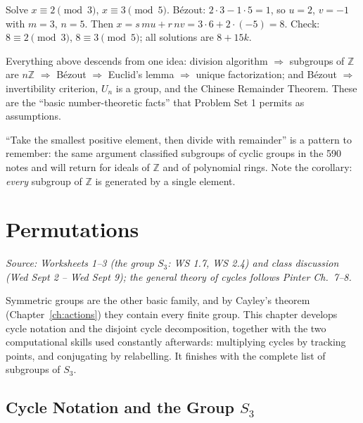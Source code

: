 \documentclass[11pt]{report}
\begin{document}
\begin{exbox}\label{ex:crt-computation}
Solve $x \equiv 2 \pmod 3$, $x \equiv 3 \pmod 5$. B\'ezout: $2 \cdot 3 - 1 \cdot 5 = 1$, so $u = 2$, $v = -1$ with $m = 3$, $n = 5$. Then $x = s\,mu + r\,nv = 3 \cdot 6 + 2 \cdot (-5) = 8$. Check: $8 \equiv 2 \pmod 3$, $8 \equiv 3 \pmod 5$; all solutions are $8 + 15k$.
\end{exbox}

\begin{rembox}\label{rem:dependency-chain-z}
Everything above descends from one idea: division algorithm $\Rightarrow$ subgroups of $\mathbb{Z}$ are $n\mathbb{Z}$ $\Rightarrow$ B\'ezout $\Rightarrow$ Euclid's lemma $\Rightarrow$ unique factorization; and B\'ezout $\Rightarrow$ invertibility criterion, $U_n$ is a group, and the Chinese Remainder Theorem. These are the ``basic number-theoretic facts'' that Problem Set 1 permits as assumptions.
\end{rembox}

\begin{rembox}\label{rem:division-algorithm-pattern}
``Take the smallest positive element, then divide with remainder'' is a pattern to remember: the same argument classified subgroups of cyclic groups in the 590 notes and will return for ideals of $\mathbb{Z}$ and of polynomial rings. Note the corollary: \emph{every} subgroup of $\mathbb{Z}$ is generated by a single element.
\end{rembox}

\chapter{Permutations}\label{ch:perms}

\textit{Source: Worksheets 1--3 (the group $S_3$: WS 1.7, WS 2.4) and class discussion (Wed Sept 2 -- Wed Sept 9); the general theory of cycles follows Pinter Ch.\ 7--8.}

Symmetric groups are the other basic family, and by Cayley's theorem (Chapter~\ref{ch:actions}) they contain every finite group. This chapter develops cycle notation and the disjoint cycle decomposition, together with the two computational skills used constantly afterwards: multiplying cycles by tracking points, and conjugating by relabelling. It finishes with the complete list of subgroups of $S_3$.

\section{\texorpdfstring{Cycle Notation and the Group $S_3$}{Cycle Notation and the Group S₃}}\label{sec:cycles}
\end{document}
